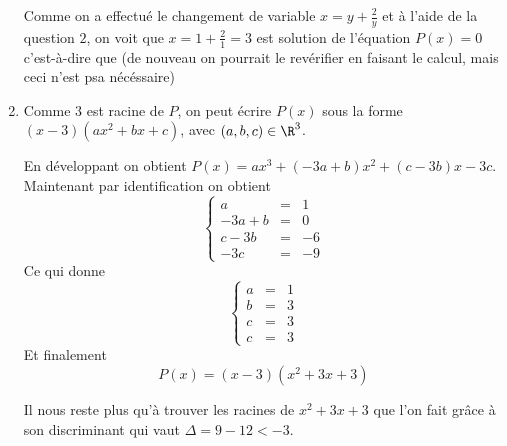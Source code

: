 \documentclass[a4paper, 11pt,reqno]{article}
\begin{document}
\begin{correction}
\begin{enumerate}
Comme  on a effectué le changement de variable  $x=y+\frac{2}{y}$ et à l'aide de la question $2$, on voit que $x=1+\frac{2}{1}=3$ est solution de l'équation $P(x)=0$ c'est-à-dire que 
 (de nouveau on pourrait le revérifier en faisant le calcul, mais ceci n'est psa nécéssaire)

\item Comme $3$ est racine de $P$, on peut écrire $P(x)$ sous la forme $(x-3)(ax^2+bx+c)$, avec $(a,b,c)\in \R^3$. 

En développant on obtient 
$P(x)= ax^3 +(-3a+b)x^2+(c-3b)x-3c.$ Maintenant par identification on obtient 
$$\left\{\begin{array}{ccc}
a&=&1\\
-3a+b&=&0\\
c-3b&=&-6\\
-3c&=&-9
\end{array}\right.$$
Ce qui donne 
$$\left\{\begin{array}{ccc}
a&=&1\\
b&=&3\\
c&=&3\\
c&=&3
\end{array}\right.$$
Et finalement 
$$P(x) = (x-3) (x^2+3x+3)$$

Il nous reste plus qu'à trouver les racines de $x^2+3x+3$ que l'on fait grâce à son discriminant qui vaut $\Delta =9-12<-3$. 




 
\end{enumerate}

\end{correction}
\end{document}
